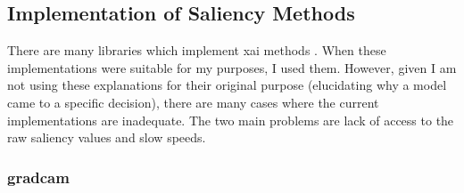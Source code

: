 \documentclass[UKenglish]{uiomasterthesis} %
\theoremstyle{definition}
\begin{document}
%
%
%

\subsection{Implementation of Saliency Methods}

There are many libraries which implement \ac{xai} methods \cite{lime, captum, jacobgilpytorchcam}. When these implementations were suitable for my purposes, I used them. However, given I am not using these explanations for their original purpose (elucidating why a model came to a specific decision), there are many cases where the current implementations are inadequate. The two main problems are lack of access to the raw saliency values and slow speeds.

\subsubsection{\ac{gradcam}}
\end{document}

